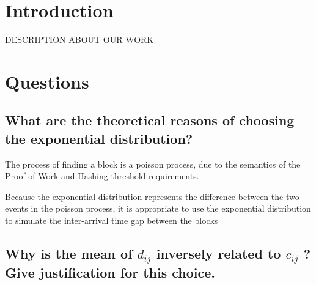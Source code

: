 \documentclass[a4paper,14pt]{article}
\begin{document}

\date{Spring 2023}
\maketitle

\justifying


\justifying

\section*{Introduction}

DESCRIPTION ABOUT OUR WORK

\section{Questions}

\subsection{ What are the theoretical reasons of choosing the exponential distribution?}

The process of finding a block is a poisson process, due to the semantics of the Proof of Work and Hashing threshold requirements.

Because the exponential distribution represents the difference between the two events in the poisson process, it is appropriate to use the exponential distribution to simulate the inter-arrival time gap between the blocks

\subsection{ Why is the mean of $d_{ij}$ inversely related to $c_{ij}$ ? Give justification for this choice.}
\end{document}
